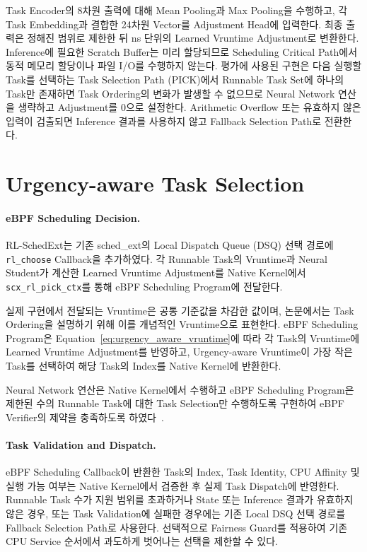 Task Encoder의 8차원 출력에 대해 Mean Pooling과 Max Pooling을 수행하고, 각 Task Embedding과 결합한 24차원 Vector를 Adjustment Head에 입력한다.
최종 출력은 정해진 범위로 제한한 뒤 ns 단위의 Learned Vruntime Adjustment로 변환한다.
Inference에 필요한 Scratch Buffer는 미리 할당되므로 Scheduling Critical Path에서 동적 메모리 할당이나 파일 I/O를 수행하지 않는다.
평가에 사용된 구현은 다음 실행할 Task를 선택하는 Task Selection Path (PICK)에서 Runnable Task Set에 하나의 Task만 존재하면 Task Ordering의 변화가 발생할 수 없으므로 Neural Network 연산을 생략하고 Adjustment를 0으로 설정한다.
Arithmetic Overflow 또는 유효하지 않은 입력이 검출되면 Inference 결과를 사용하지 않고 Fallback Selection Path로 전환한다.

\section{Urgency-aware Task Selection}
\label{sec:runtime_task_selection}

\paragraph{eBPF Scheduling Decision.}
RL-SchedExt는 기존 sched\_ext의 Local Dispatch Queue (DSQ)
선택 경로에 \texttt{rl\_choose} Callback을 추가하였다.
각 Runnable Task의 Vruntime과
Neural Student가 계산한 Learned Vruntime Adjustment를
Native Kernel에서 \texttt{scx\_rl\_pick\_ctx}를 통해
eBPF Scheduling Program에 전달한다.

실제 구현에서 전달되는 Vruntime은 공통 기준값을 차감한 값이며,
논문에서는 Task Ordering을 설명하기 위해 이를 개념적인 Vruntime으로
표현한다.
eBPF Scheduling Program은 Equation~\ref{eq:urgency_aware_vruntime}에
따라 각 Task의 Vruntime에 Learned Vruntime Adjustment를
반영하고, Urgency-aware Vruntime이 가장 작은 Task를 선택하여
해당 Task의 Index를 Native Kernel에 반환한다.

Neural Network 연산은 Native Kernel에서 수행하고
eBPF Scheduling Program은 제한된 수의 Runnable Task에 대한
Task Selection만 수행하도록 구현하여
eBPF Verifier의 제약을 충족하도록 하였다~\cite{bpfverifier}.


\paragraph{Task Validation and Dispatch.}
eBPF Scheduling Callback이 반환한 Task의 Index, Task Identity,
CPU Affinity 및 실행 가능 여부는 Native Kernel에서 검증한 후
실제 Task Dispatch에 반영한다.
Runnable Task 수가 지원 범위를 초과하거나 State 또는 Inference
결과가 유효하지 않은 경우, 또는 Task Validation에 실패한 경우에는
기존 Local DSQ 선택 경로를 Fallback Selection Path로 사용한다.
선택적으로 Fairness Guard를 적용하여 기존 CPU Service
순서에서 과도하게 벗어나는 선택을 제한할 수 있다.

